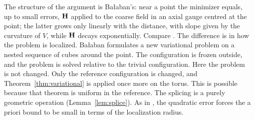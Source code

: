 \begin{remark}
The structure of the argument is Ba\l aban's: near a point the minimizer equals, up to small errors, $\mathbf H$ applied to the coarse field in an axial gauge centred at the point; the latter grows only linearly with the distance, with slope given by the curvature of $V$, while $\mathbf H$ decays exponentially. Compare \cite[(159)--(167)]{BalVar}. The difference is in how the problem is localized. Ba\l aban formulates a new variational problem on a nested sequence of cubes around the point. The configuration is frozen outside, and the problem is solved relative to the trivial configuration. Here the problem is not changed. Only the reference configuration is changed, and Theorem~\ref{thm:variational} is applied once more on the torus. This is possible because that theorem is uniform in the reference. The splicing is a purely geometric operation (Lemma~\ref{lem:splice}). As in \cite[(166)]{BalVar}, the quadratic error forces the a priori bound to be small in terms of the localization radius.
\end{remark}
